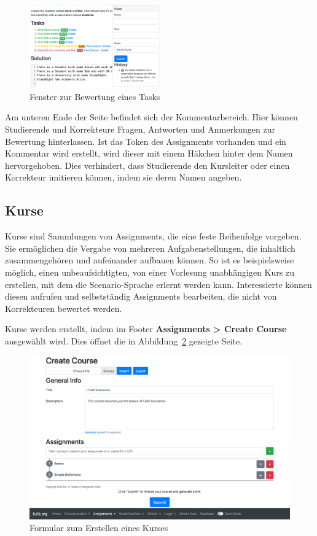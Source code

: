 \begin{figure}
    \centering
    \includegraphics[width=0.5\textwidth]{chapter/fulib.org/img/grade-popover.png}
    \caption{Fenster zur Bewertung eines Tasks}
    \label{fig:grade-popover}
\end{figure}

Am unteren Ende der Seite befindet sich der Kommentarbereich.
Hier können Studierende und Korrekteure Fragen, Antworten und Anmerkungen zur Bewertung hinterlassen.
Ist das Token des Assignments vorhanden und ein Kommentar wird erstellt, wird dieser mit einem Häkchen hinter dem Namen hervorgehoben.
Dies verhindert, dass Studierende den Kursleiter oder einen Korrekteur imitieren können, indem sie deren Namen angeben.

\subsection{Kurse}\label{subsec:courses}

Kurse sind Sammlungen von Assignments, die eine feste Reihenfolge vorgeben.
Sie ermöglichen die Vergabe von mehreren Aufgabenstellungen, die inhaltlich zusammengehören und aufeinander aufbauen können.
So ist es beispielsweise möglich, einen unbeaufsichtigten, von einer Vorlesung unabhängigen Kurs zu erstellen, mit dem die Scenario-Sprache erlernt werden kann.
Interessierte können diesen aufrufen und selbstständig Assignments bearbeiten, die nicht von Korrekteuren bewertet werden.

Kurse werden erstellt, indem im Footer \textbf{Assignments > Create Course} ausgewählt wird.
Dies öffnet die in Abbildung~\ref{fig:create-course} gezeigte Seite.

\begin{figure}
    \centering
    \includegraphics[width=\textwidth]{chapter/fulib.org/img/create-course.png}
    \caption{Formular zum Erstellen eines Kurses}
    \label{fig:create-course}
\end{figure}


